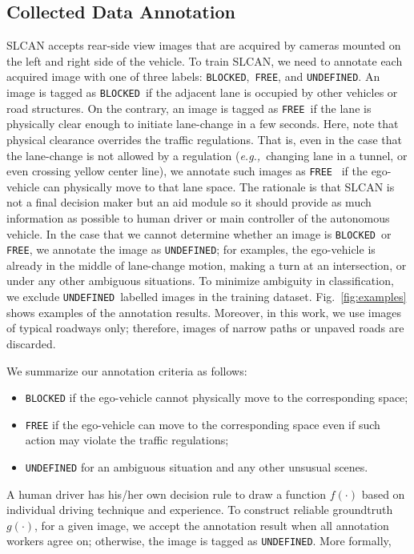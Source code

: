 \documentclass[letterpaper, 10pt, conference]{ieeeconf}
\newcommand{\eg}{\textit{e.g.,}~}
\newcommand{\B}{{\tt BLOCKED}}
\newcommand{\F}{{\tt FREE}}
\newcommand{\ud}{{\tt UNDEFINED}}
\begin{document}
	\subsection{Collected Data Annotation}%
	SLCAN accepts rear-side view images that are acquired by cameras mounted on 
the left and right side of the vehicle.  To train SLCAN, we need to annotate each 
acquired image with one of three labels: \B,~\F, and \ud.  An image is tagged as \B~if 
the adjacent lane is occupied by other vehicles or road structures.  On the contrary, 
an image is tagged as \F~if the lane is physically clear enough to initiate lane-change 
in a few seconds.  Here, note that physical clearance overrides the traffic regulations.  
That is, even in the case that the lane-change is not allowed by a regulation 
(\eg changing lane in a tunnel, or even crossing yellow center line), we annotate such 
images as \F~ if the ego-vehicle can physically move to that lane space. The rationale 
is that SLCAN is not a final decision maker but an aid module so it should provide as 
much information as possible to human driver or main controller of the autonomous vehicle. 
In the case that we cannot determine whether an image is \B~or \F, we annotate the image 
as \ud; for examples, the ego-vehicle is already in the middle of lane-change motion,
making a turn at an intersection, or under any other ambiguous situations. To minimize 
ambiguity in classification, we exclude \ud~labelled images in the training dataset. 
Fig.~\ref{fig:examples} shows examples of the annotation results. Moreover, in this work, 
we use images of typical roadways only; therefore, images of narrow paths or unpaved 
roads are discarded.
	
	We summarize our annotation criteria as follows:
	\begin{itemize}\it
		\item {\tt BLOCKED} if the ego-vehicle cannot physically move to the corresponding space;
		\item {\tt FREE} if the ego-vehicle can move to the corresponding space even if such action may violate the traffic regulations;
		\item {\tt UNDEFINED} for an ambiguous situation and any other unsusual scenes.
	\end{itemize}

	A human driver has his/her own decision rule to draw a function $f(\cdot)$ 
based on individual driving technique and experience. To construct reliable 
groundtruth $g(\cdot)$, for a given image, we accept the annotation result when all 
annotation workers agree on; otherwise, the image is tagged as \ud. More formally,
\end{document}
